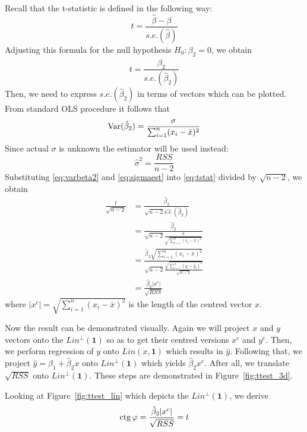 Recall that the t-statistic is defined in the following way:
\[
t = \frac{\hat \beta - \beta}{s.e.(\hat\beta)}
\]
Adjusting this formula for the null hypothesis $H_0: \beta_2 = 0$, we obtain
\begin{equation}\label{eq:tstat}
t = \frac{\hat \beta_2}{s.e.(\hat\beta_2)}
\end{equation}
Then, we need to express $s.e.(\hat\beta_2)$ in terms of vectors which can be
plotted. From standard OLS procedure it follows that
\begin{equation}\label{eq:varbeta2}
\operatorname{Var}(\hat \beta_2) = \frac{\sigma}{\sum_{i=1}^n (x_i - \bar x)^2}
\end{equation}
Since actual $\sigma$ is unknown the estimator will be used instead:
\begin{equation}\label{eq:sigmaest}
\hat \sigma^2 = \frac{RSS}{n-2}
\end{equation}
Substituting \eqref{eq:varbeta2} and \eqref{eq:sigmaest} into \eqref{eq:tstat}
divided by $\sqrt{n-2}$, we obtain
\begin{align*}
\frac{t}{\sqrt{n-2}} &= \frac{\hat \beta_2}{\sqrt{n-2}\widehat{s.e.}(\hat\beta_2)} \\
&= \frac{\hat \beta_2}{\sqrt{n-2}\frac{\hat \sigma}{\sqrt{\sum_{i=1}^n (x_i - \bar x)^2}}} \\
&= \frac{\hat \beta_2 \sqrt{\sum_{i=1}^n (x_i - \bar x)^2}}{\sqrt{n-2}\frac{\sqrt{\sum_{i=1}^n (y_i - \hat y_i)^2}}{\sqrt{n-2}}} \\
&= \frac{\hat \beta_2 \vert x^c \vert}{\sqrt{RSS}}
\end{align*}
where $ \vert x^c \vert = \sqrt{\sum_{i=1}^n (x_i - \bar x)^2}$ is the length of the
centred vector $x$.

Now the result can be demonstrated visually.
Again we will project $x$ and $y$ vectors onto the $Lin^{\perp}(\mathbf{1})$ so as to
get their centred versions $x^c$ and $y^c$.
Then, we perform regression of $y$ onto $Lin(x, \mathbf{1})$ which results in $\hat y$.
Following that, we project $\hat y = \hat \beta_1 + \hat \beta_2 x$ onto $Lin^{\perp}(\mathbf{1})$
which yields $\hat \beta_2 x^c$.
After all, we translate $\sqrt{RSS}$ onto $Lin^{\perp}(\mathbf{1})$.
These steps are demonstrated in Figure~\ref{fig:ttest_3d}.

Looking at Figure~\ref{fig:ttest_lin} which depicts the $Lin^{\perp}(\mathbf{1})$,
we derive
\[
\operatorname{ctg} \varphi = \frac{\hat \beta_2 \vert x^c \vert}{\sqrt{RSS}} = t
\]

